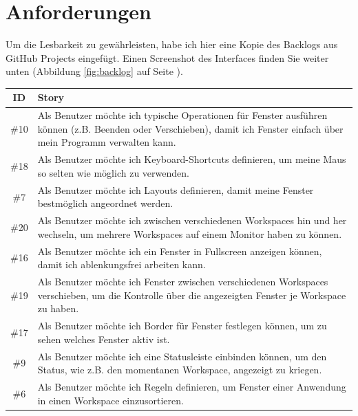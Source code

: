 \documentclass{article}
\begin{document}
\vspace{0em}
\newpage

\section{Anforderungen}

Um die Lesbarkeit zu gewährleisten, habe ich hier eine Kopie des Backlogs aus GitHub Projects eingefügt.
Einen Screenshot des Interfaces finden Sie weiter unten (Abbildung \ref{fig:backlog} auf Seite \pageref{fig:backlog}).

\vspace{1em}

\begin{tabularx}{\textwidth}{|c|X|}
	\hline
	\textbf{ID} & \textbf{Story}                                                                                                                                                          \\
	\hline
	\#10        & Als Benutzer möchte ich typische Operationen für Fenster ausführen können (z.B. Beenden oder Verschieben), damit ich Fenster einfach über mein Programm verwalten kann. \\
	\hline
	\#18        & Als Benutzer möchte ich Keyboard-Shortcuts definieren, um meine Maus so selten wie möglich zu verwenden.                                                                \\
	\hline
	\#7         & Als Benutzer möchte ich Layouts definieren, damit meine Fenster bestmöglich angeordnet werden.                                                                          \\
	\hline
	\#20        & Als Benutzer möchte ich zwischen verschiedenen Workspaces hin und her wechseln, um mehrere Workspaces auf einem Monitor haben zu können.                                \\
	\hline
	\#16        & Als Benutzer möchte ich ein Fenster in Fullscreen anzeigen können, damit ich ablenkungsfrei arbeiten kann.                                                              \\
	\hline
	\#19        & Als Benutzer möchte ich Fenster zwischen verschiedenen Workspaces verschieben, um die Kontrolle über die angezeigten Fenster je Workspace zu haben.                     \\
	\hline
	\#17        & Als Benutzer möchte ich Border für Fenster festlegen können, um zu sehen welches Fenster aktiv ist.                                                                      \\
	\hline
	\#9         & Als Benutzer möchte ich eine Statusleiste einbinden können, um den Status, wie z.B. den momentanen Workspace, angezeigt zu kriegen.                                     \\
	\hline
	\#6         & Als Benutzer möchte ich Regeln definieren, um Fenster einer Anwendung in einen Workspace einzusortieren.                                                                \\
\end{tabularx}
\end{document}
